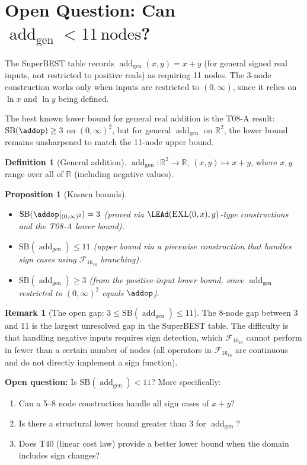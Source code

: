 \documentclass[12pt,a4paper]{article}
\newtheorem{proposition}[theorem]{Proposition}
\theoremstyle{definition}
\newtheorem{definition}[theorem]{Definition}
\newtheorem{remark}[theorem]{Remark}
\newcommand{\EXL}{\operatorname{EXL}}
\newcommand{\F}{\mathcal{F}_{16}}
\newcommand{\SB}{\mathrm{SB}}
\newcommand{\addgen}{\operatorname{add}_{\mathrm{gen}}}
\begin{document}
\section{Open Question: Can \texorpdfstring{$\addgen < 11\,\text{nodes}$}{add\_gen < 11 nodes}?}
\label{sec:open}

The SuperBEST table records $\addgen(x,y) = x+y$ (for general signed real
inputs, not restricted to positive reals) as requiring 11 nodes.  The 3-node
construction works only when inputs are restricted to $(0,\infty)$, since it
relies on $\ln x$ and $\ln y$ being defined.

The best known lower bound for general real addition is the T08-A result:
$\SB(\addop) \ge 3$ on $(0,\infty)^2$, but for general $\addgen$ on $\mathbb{R}^2$,
the lower bound remains unsharpened to match the 11-node upper bound.

\begin{definition}[General addition]
$\addgen: \mathbb{R}^2 \to \mathbb{R}$, $(x,y) \mapsto x+y$, where $x,y$
range over all of $\mathbb{R}$ (including negative values).
\end{definition}

\begin{proposition}[Known bounds]
\label{prop:add-bounds}
\mbox{}
\begin{itemize}
  \item $\SB(\addop|_{(0,\infty)^2}) = 3$ (proved via $\LEAd(\EXL(0,x),y)$-type
    constructions and the T08-A lower bound).
  \item $\SB(\addgen) \le 11$ (upper bound via a piecewise construction that
    handles sign cases using $\F_{16}$ branching).
  \item $\SB(\addgen) \ge 3$ (from the positive-input lower bound, since
    $\addgen$ restricted to $(0,\infty)^2$ equals $\addop$).
\end{itemize}
\end{proposition}

\begin{remark}[The open gap: $3 \le \SB(\addgen) \le 11$]
The 8-node gap between 3 and 11 is the largest unresolved gap in the
SuperBEST table.  The difficulty is that handling negative inputs requires
sign detection, which $\F_{16}$ cannot perform in fewer than a certain number
of nodes (all operators in $\F_{16}$ are continuous and do not directly
implement a sign function).

\textbf{Open question:} Is $\SB(\addgen) < 11$?  More specifically:
\begin{enumerate}
  \item Can a 5--8 node construction handle all sign cases of $x+y$?
  \item Is there a structural lower bound greater than 3 for $\addgen$?
  \item Does T40 (linear cost law) provide a better lower bound when the
    domain includes sign changes?
\end{enumerate}
\end{remark}
\end{document}
